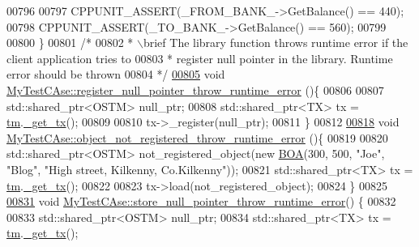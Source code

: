 \begin{DoxyCode}
00796     
00797     CPPUNIT\_ASSERT(\_FROM\_BANK\_->GetBalance() == 440);
00798     CPPUNIT\_ASSERT(\_TO\_BANK\_->GetBalance() == 560);
00799     
00800 \}
00801 \textcolor{comment}{/*}
00802 \textcolor{comment}{ * \(\backslash\)brief The library function throws runtime error if the client application tries to }
00803 \textcolor{comment}{ * register null pointer in the library. Runtime error should be thrown}
00804 \textcolor{comment}{ */}
\hypertarget{_my_test_c_ase_8cpp_source.tex_l00805}{}\hyperlink{class_my_test_c_ase_a80f9123880a0b79e4119f2f4699847ec_a80f9123880a0b79e4119f2f4699847ec}{00805} \textcolor{keywordtype}{void} \hyperlink{class_my_test_c_ase_a80f9123880a0b79e4119f2f4699847ec_a80f9123880a0b79e4119f2f4699847ec}{MyTestCAse::register\_null\_pointer\_throw\_runtime\_error}
      ()\{
00806     
00807     std::shared\_ptr<OSTM> null\_ptr; 
00808     std::shared\_ptr<TX> tx = \hyperlink{class_my_test_c_ase_a422e6e5d4ddedea384be96031c89b72b_a422e6e5d4ddedea384be96031c89b72b}{tm}.\hyperlink{class_t_m_a41cb0226cc4080c931651b13f74a0075_a41cb0226cc4080c931651b13f74a0075}{\_get\_tx}();
00809 
00810     tx->\_register(null\_ptr);
00811 \}
00812 
\hypertarget{_my_test_c_ase_8cpp_source.tex_l00818}{}\hyperlink{class_my_test_c_ase_aa3a8c942db63dcf082f85013b7a09ee1_aa3a8c942db63dcf082f85013b7a09ee1}{00818} \textcolor{keywordtype}{void} \hyperlink{class_my_test_c_ase_aa3a8c942db63dcf082f85013b7a09ee1_aa3a8c942db63dcf082f85013b7a09ee1}{MyTestCAse::object\_not\_registered\_throw\_runtime\_error}
      ()\{
00819     
00820     std::shared\_ptr<OSTM> not\_registered\_object(\textcolor{keyword}{new} \hyperlink{class_b_o_a}{BOA}(300, 500, \textcolor{stringliteral}{"Joe"}, \textcolor{stringliteral}{"Blog"}, \textcolor{stringliteral}{"High street, Kilkenny,
       Co.Kilkenny"}));
00821     std::shared\_ptr<TX> tx = \hyperlink{class_my_test_c_ase_a422e6e5d4ddedea384be96031c89b72b_a422e6e5d4ddedea384be96031c89b72b}{tm}.\hyperlink{class_t_m_a41cb0226cc4080c931651b13f74a0075_a41cb0226cc4080c931651b13f74a0075}{\_get\_tx}();
00822 
00823     tx->load(not\_registered\_object);
00824 \}
00825 
\hypertarget{_my_test_c_ase_8cpp_source.tex_l00831}{}\hyperlink{class_my_test_c_ase_aae8eeb07dfdc5411255b064bc57b855d_aae8eeb07dfdc5411255b064bc57b855d}{00831} \textcolor{keywordtype}{void} \hyperlink{class_my_test_c_ase_aae8eeb07dfdc5411255b064bc57b855d_aae8eeb07dfdc5411255b064bc57b855d}{MyTestCAse::store\_null\_pointer\_throw\_runtime\_error}()
      \{
00832     
00833     std::shared\_ptr<OSTM> null\_ptr; 
00834     std::shared\_ptr<TX> tx = \hyperlink{class_my_test_c_ase_a422e6e5d4ddedea384be96031c89b72b_a422e6e5d4ddedea384be96031c89b72b}{tm}.\hyperlink{class_t_m_a41cb0226cc4080c931651b13f74a0075_a41cb0226cc4080c931651b13f74a0075}{\_get\_tx}();

\end{DoxyCode}
